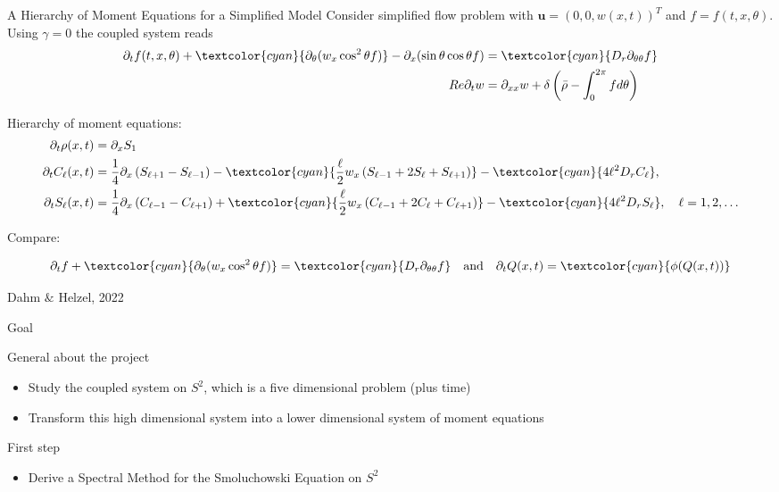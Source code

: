 \begin{frame}{A Hierarchy of Moment Equations for a Simplified Model}
	\scriptsize
	Consider simplified flow problem with $\boldsymbol{u} = (0,0, w(x,t))^T$ and $f=f(t,x,\theta)$. Using $\gamma = 0$ the coupled system reads
	\begin{align*}
		\partial_t f(t,x,\theta) +  \textcolor{cyan}{\partial_\theta(w_x \cos^2 \theta f)} - \partial_x (\sin \theta \cos \theta f) &=  \textcolor{cyan}{D_r \partial_{\theta\theta} f} \\
		R e \partial_t w &=\partial_{x x} w+\delta\left(\bar{\rho}-\int_0^{2 \pi} f d \theta\right)
	\end{align*}

	Hierarchy of moment equations:
	\begin{align*}
		\partial_t \rho(x, t) & = \partial_x S_1 \\
		\partial_t C_{\ell}(x, t) & = \frac{1}{4} \partial_x\left(S_{\ell+1}-S_{\ell-1}\right)- \textcolor{cyan}{\frac{\ell}{2} w_x\left(S_{\ell-1}+2 S_{\ell}+S_{\ell+1}\right)}- \textcolor{cyan}{4 \ell^2 D_r C_{\ell}}, \\
		\partial_t S_{\ell}(x, t) & =\frac{1}{4} \partial_x\left(C_{\ell-1}-C_{\ell+1}\right)+  \textcolor{cyan}{\frac{\ell}{2} w_x\left(C_{\ell-1}+2 C_{\ell}+C_{\ell+1}\right)}- \textcolor{cyan}{4 \ell^2 D_r S_{\ell}}, \quad \ell=1,2, \ldots
	\end{align*}

	Compare:
	
	\begin{align*}
		\partial_t f + \textcolor{cyan}{\partial_\theta(w_x \cos^2 \theta f)} = \textcolor{cyan}{D_r \partial_{\theta\theta} f} \quad \text{and} \quad \partial_t Q(x,t) = \textcolor{cyan}{\phi(Q(x,t))}
	\end{align*}
	
	\begin{beamercolorbox}[sep=1em,wd=\linewidth,right]{}
		\tiny{Dahm $\&$ Helzel, 2022}
	\end{beamercolorbox}
\end{frame}


\begin{frame}{Goal}
	\scriptsize
	\begin{block}{General about the project}
		\begin{itemize}
			\item <1->  Study the coupled system on $S^2$, which is a five dimensional problem (plus time)
			\item <2->  Transform this high dimensional system into a lower dimensional system of moment equations
		\end{itemize}
	\end{block}
	\begin{block}{First step}
		\begin{itemize}
			\item <3-> Derive a Spectral Method for the Smoluchowski Equation on $S^2$
		\end{itemize}
	\end{block}
	
\end{frame}

